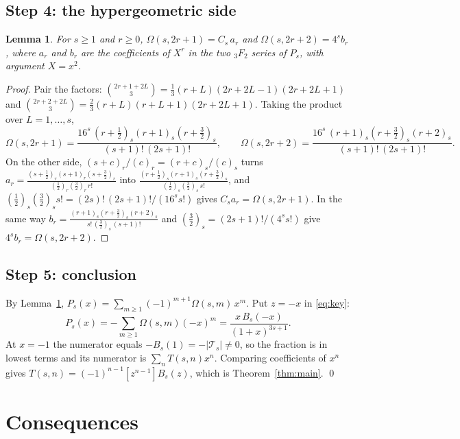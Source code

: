 \documentclass[11pt]{amsart}
\newtheorem{lemma}[theorem]{Lemma}
\theoremstyle{remark}
\newcommand{\Om}{\Omega}
\begin{document}
\subsection*{Step 4: the hypergeometric side}
\begin{lemma}\label{lem:hyp}
For $s \ge 1$ and $r \ge 0$, $\Om(s,2r+1) = C_s\,a_r$ and $\Om(s,2r+2) = 4^s b_r$, where $a_r$ and $b_r$ are the
coefficients of $X^r$ in the two ${}_3F_2$ series of $P_s$, with argument $X = x^2$.
\end{lemma}
\begin{proof}
Pair the factors: $\binom{2r+1+2L}{3} = \tfrac13 (r+L)(2r+2L-1)(2r+2L+1)$ and
$\binom{2r+2+2L}{3} = \tfrac23 (r+L)(r+L+1)(2r+2L+1)$. Taking the product over $L = 1, \dots, s$,
\[
  \Om(s,2r+1) = \frac{16^s\,(r+\frac12)_s (r+1)_s (r+\frac32)_s}{(s+1)!\,(2s+1)!}, \qquad
  \Om(s,2r+2) = \frac{16^s\,(r+1)_s (r+\frac32)_s (r+2)_s}{(s+1)!\,(2s+1)!}.
\]
On the other side, $(s+c)_r/(c)_r = (r+c)_s/(c)_s$ turns
$a_r = \frac{(s+\frac12)_r (s+1)_r (s+\frac32)_r}{(\frac12)_r (\frac32)_r\, r!}$ into
$\frac{(r+\frac12)_s (r+1)_s (r+\frac32)_s}{(\frac12)_s (\frac32)_s\, s!}$, and
$(\tfrac12)_s(\tfrac32)_s s! = (2s)!\,(2s+1)!/(16^s s!)$ gives $C_s a_r = \Om(s,2r+1)$. In the same way
$b_r = \frac{(r+1)_s (r+\frac32)_s (r+2)_s}{s!\,(\frac32)_s\,(s+1)!}$ and $(\tfrac32)_s = (2s+1)!/(4^s s!)$ give
$4^s b_r = \Om(s,2r+2)$.
\end{proof}

\subsection*{Step 5: conclusion}
By Lemma~\ref{lem:hyp}, $P_s(x) = \sum_{m\ge1} (-1)^{m+1}\Om(s,m)\,x^m$. Put $z = -x$ in \eqref{eq:key}:
\[
  P_s(x) = -\sum_{m \ge 1}\Om(s,m)(-x)^m = \frac{x\,B_s(-x)}{(1+x)^{3s+1}} .
\]
At $x = -1$ the numerator equals $-B_s(1) = -|\mathcal T_s| \ne 0$, so the fraction is in lowest terms and its
numerator is $\sum_n T(s,n)x^n$. Comparing coefficients of $x^n$ gives
$T(s,n) = (-1)^{n-1}[z^{n-1}]B_s(z)$, which is Theorem~\ref{thm:main}. \qed

\section{Consequences}
\end{document}
